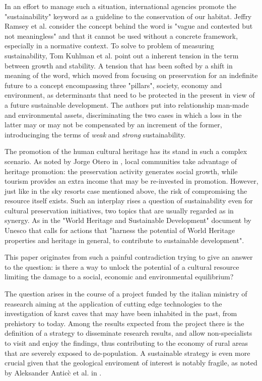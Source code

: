 \documentclass[sustainability,article,submit,pdftex,moreauthors]{Definitions/mdpi}
\begin{document}
In an effort to manage such a situation, international agencies promote the "sustainability" keyword as a guideline to the conservation of our habitat. Jeffry Ramsey et al. \cite{ram15a} consider the concept behind the word is "vague and contested but not meaningless" and that it cannot be used without a concrete framework, especially in a normative context. To solve to problem of measuring sustainability, Tom Kuhlman et al. point out a inherent tension in the term between growth and stability. A tension that has been softed by a shift in meaning of the word, which moved from focusing on preservation for an indefinite future to a concept encompassing three "pillars", society, economy and environment, as determinants that need to be protected in the present in view of a future sustainable development. The authors put into relationship man-made and environmental assets, discriminating the two cases in which a loss in the latter may or may not be compensated by an increment of the former, introducinging the terms of {\em weak} and {\em strong} sustainability.

The promotion of the human cultural heritage has its stand in such a complex scenario. As noted by Jorge Otero in \cite{ote22a}, local communities take advantage of heritage promotion: the preservation activity generates social growth, while tourism provides an extra income that may be re-invested in promotion. However, just like in the sky resorts case mentioned above, the risk of compromising the resource itself exists. Such an interplay rises a question of sustainability even for cultural preservation initiatives, two topics that are usually regarded as in synergy. As in the "World Heritage and Sustainable Development" document by Unesco \cite{lab17a} that calls for actions that "harness the potential of World Heritage properties and heritage in general, to contribute to sustainable development".

This paper originates from such a painful contradiction trying to give an answer to the question: is there a way to unlock the potential of a cultural resource limiting the damage to a social, economic and environmental equilibrium?

The question arises in the course of a project funded by the italian ministry of reasearch aiming at the application of cutting edge technologies to the investigation of karst caves that may have been inhabited in the past, from prehistory to today. Among the results expected from the project there is the definition of a strategy to disseminate research results, and allow non-specialists to visit and enjoy the findings, thus contributing to the economy of rural areas that are severely exposed to de-population. A sustainable strategy is even more crucial given that the geological enviroment of interest is notably fragile, as noted by Aleksander Antic\`c et al. in \cite{ant20a}.
\end{document}

